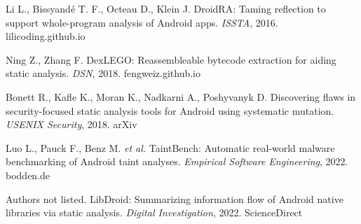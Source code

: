 \documentclass[a4paper,12pt]{report}
\begin{document}
\begin{thebibliography}{99}
    Li L., Bissyandé T. F., Octeau D., Klein J. DroidRA: Taming reflection to support whole-program analysis of Android apps. \textit{ISSTA}, 2016. lilicoding.github.io

    Ning Z., Zhang F. DexLEGO: Reassembleable bytecode extraction for aiding static analysis. \textit{DSN}, 2018. fengweiz.github.io

    Bonett R., Kafle K., Moran K., Nadkarni A., Poshyvanyk D. Discovering flaws in security-focused static analysis tools for Android using systematic mutation. \textit{USENIX Security}, 2018. arXiv

    Luo L., Pauck F., Benz M. \emph{et al.} TaintBench: Automatic real-world malware benchmarking of Android taint analyses. \textit{Empirical Software Engineering}, 2022. bodden.de

    Authors not listed. LibDroid: Summarizing information flow of Android native libraries via static analysis. \textit{Digital Investigation}, 2022. ScienceDirect


\end{thebibliography}
\end{document}
